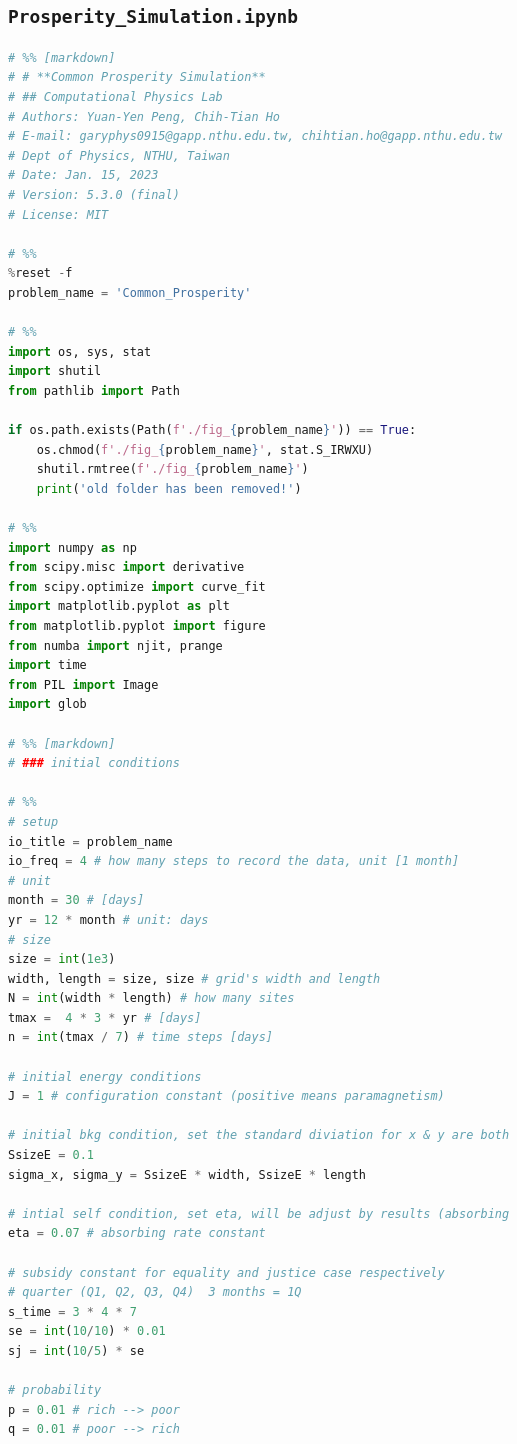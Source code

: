 \documentclass[10pt]{article}
\begin{document}
    \subsection*{\texttt{Prosperity\_Simulation.ipynb}}
        \begin{lstlisting}[language={Python}]
# %% [markdown]
# # **Common Prosperity Simulation**
# ## Computational Physics Lab 
# Authors: Yuan-Yen Peng, Chih-Tian Ho  
# E-mail: garyphys0915@gapp.nthu.edu.tw, chihtian.ho@gapp.nthu.edu.tw  
# Dept of Physics, NTHU, Taiwan   
# Date: Jan. 15, 2023  
# Version: 5.3.0 (final)      
# License: MIT

# %%
%reset -f
problem_name = 'Common_Prosperity'

# %%
import os, sys, stat
import shutil
from pathlib import Path

if os.path.exists(Path(f'./fig_{problem_name}')) == True:
    os.chmod(f'./fig_{problem_name}', stat.S_IRWXU)
    shutil.rmtree(f'./fig_{problem_name}')
    print('old folder has been removed!')

# %%
import numpy as np
from scipy.misc import derivative
from scipy.optimize import curve_fit
import matplotlib.pyplot as plt
from matplotlib.pyplot import figure
from numba import njit, prange
import time
from PIL import Image
import glob

# %% [markdown]
# ### initial conditions

# %%
# setup
io_title = problem_name
io_freq = 4 # how many steps to record the data, unit [1 month]
# unit
month = 30 # [days]
yr = 12 * month # unit: days
# size
size = int(1e3)
width, length = size, size # grid's width and length
N = int(width * length) # how many sites
tmax =  4 * 3 * yr # [days]
n = int(tmax / 7) # time steps [days]

# initial energy conditions
J = 1 # configuration constant (positive means paramagnetism)

# initial bkg condition, set the standard diviation for x & y are both 3 
SsizeE = 0.1
sigma_x, sigma_y = SsizeE * width, SsizeE * length

# intial self condition, set eta, will be adjust by results (absorbing coeff)
eta = 0.07 # absorbing rate constant

# subsidy constant for equality and justice case respectively
# quarter (Q1, Q2, Q3, Q4)  3 months = 1Q 
s_time = 3 * 4 * 7
se = int(10/10) * 0.01
sj = int(10/5) * se

# probability
p = 0.01 # rich --> poor
q = 0.01 # poor --> rich


\end{lstlisting}
\end{document}
